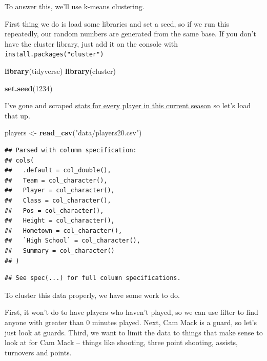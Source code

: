 \documentclass[
]{book}
\newenvironment{Shaded}{\begin{snugshade}}{\end{snugshade}}
\newcommand{\DecValTok}[1]{\textcolor[rgb]{0.00,0.00,0.81}{#1}}
\newcommand{\KeywordTok}[1]{\textcolor[rgb]{0.13,0.29,0.53}{\textbf{#1}}}
\newcommand{\NormalTok}[1]{#1}
\newcommand{\StringTok}[1]{\textcolor[rgb]{0.31,0.60,0.02}{#1}}
\begin{document}
To answer this, we'll use k-means clustering.

First thing we do is load some libraries and set a seed, so if we run this repeatedly, our random numbers are generated from the same base. If you don't have the cluster library, just add it on the console with \texttt{install.packages("cluster")}

\begin{Shaded}
\begin{Highlighting}[]
\KeywordTok{library}\NormalTok{(tidyverse)}
\KeywordTok{library}\NormalTok{(cluster)}

\KeywordTok{set.seed}\NormalTok{(}\DecValTok{1234}\NormalTok{)}
\end{Highlighting}
\end{Shaded}

I've gone and scraped \href{https://unl.box.com/s/0g56ve61y6hakyxzr1u4t534721bqvg8}{stats for every player in this current season} so let's load that up.

\begin{Shaded}
\begin{Highlighting}[]
\NormalTok{players <-}\StringTok{ }\KeywordTok{read_csv}\NormalTok{(}\StringTok{"data/players20.csv"}\NormalTok{)}
\end{Highlighting}
\end{Shaded}

\begin{verbatim}
## Parsed with column specification:
## cols(
##   .default = col_double(),
##   Team = col_character(),
##   Player = col_character(),
##   Class = col_character(),
##   Pos = col_character(),
##   Height = col_character(),
##   Hometown = col_character(),
##   `High School` = col_character(),
##   Summary = col_character()
## )
\end{verbatim}

\begin{verbatim}
## See spec(...) for full column specifications.
\end{verbatim}

To cluster this data properly, we have some work to do.

First, it won't do to have players who haven't played, so we can use filter to find anyone with greater than 0 minutes played. Next, Cam Mack is a guard, so let's just look at guards. Third, we want to limit the data to things that make sense to look at for Cam Mack -- things like shooting, three point shooting, assists, turnovers and points.
\end{document}
